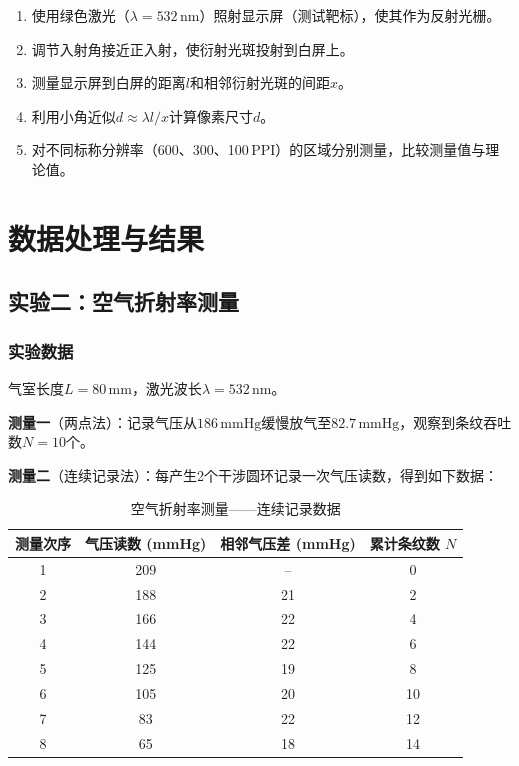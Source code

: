 \documentclass[UTF8]{article}
\begin{document}
\begin{enumerate}
    \item 使用绿色激光（$\lambda = 532\,\mathrm{nm}$）照射显示屏（测试靶标），使其作为反射光栅。
    \item 调节入射角接近正入射，使衍射光斑投射到白屏上。
    \item 测量显示屏到白屏的距离$l$和相邻衍射光斑的间距$x$。
    \item 利用小角近似$d \approx \lambda l / x$计算像素尺寸$d$。
    \item 对不同标称分辨率（600、300、100\,PPI）的区域分别测量，比较测量值与理论值。
\end{enumerate}

\section{数据处理与结果}

\subsection{实验二：空气折射率测量}

\subsubsection{实验数据}

气室长度$L = 80\,\mathrm{mm}$，激光波长$\lambda = 532\,\mathrm{nm}$。

\textbf{测量一}（两点法）：记录气压从$186\,\mathrm{mmHg}$缓慢放气至$82.7\,\mathrm{mmHg}$，观察到条纹吞吐数$N = 10$个。

\textbf{测量二}（连续记录法）：每产生2个干涉圆环记录一次气压读数，得到如下数据：

\begin{table}[H]
\centering
\caption{空气折射率测量——连续记录数据}
\begin{tabular}{cccc}
\toprule
测量次序 & 气压读数 (mmHg) & 相邻气压差 (mmHg) & 累计条纹数 $N$ \\
\midrule
1 & 209 & -- & 0 \\
2 & 188 & 21 & 2 \\
3 & 166 & 22 & 4 \\
4 & 144 & 22 & 6 \\
5 & 125 & 19 & 8 \\
6 & 105 & 20 & 10 \\
7 & 83 & 22 & 12 \\
8 & 65 & 18 & 14 \\
\bottomrule
\end{tabular}
\end{table}
\end{document}
